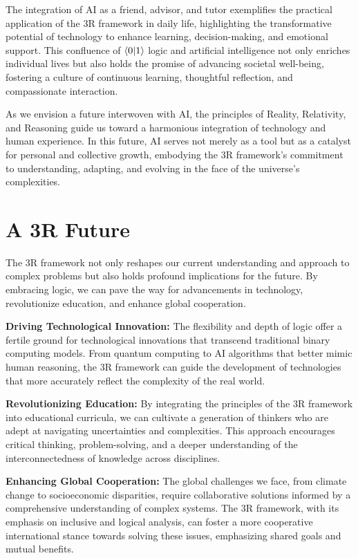 \documentclass[12pt]{article}
\begin{document}
The integration of AI as a friend, advisor, and tutor exemplifies the practical application of the 3R framework in daily life, highlighting the transformative potential of technology to enhance learning, decision-making, and emotional support. This confluence of \(\langle 0 | 1 \rangle\) logic and artificial intelligence not only enriches individual lives but also holds the promise of advancing societal well-being, fostering a culture of continuous learning, thoughtful reflection, and compassionate interaction.

As we envision a future interwoven with AI, the principles of Reality, Relativity, and Reasoning guide us toward a harmonious integration of technology and human experience. In this future, AI serves not merely as a tool but as a catalyst for personal and collective growth, embodying the 3R framework's commitment to understanding, adapting, and evolving in the face of the universe's complexities.

\section*{A 3R Future}

The 3R framework not only reshapes our current understanding and approach to complex problems but also holds profound implications for the future. By embracing \qbit{} logic, we can pave the way for advancements in technology, revolutionize education, and enhance global cooperation.

\textbf{Driving Technological Innovation:} The flexibility and depth of \qbit{} logic offer a fertile ground for technological innovations that transcend traditional binary computing models. From quantum computing to AI algorithms that better mimic human reasoning, the 3R framework can guide the development of technologies that more accurately reflect the complexity of the real world.

\textbf{Revolutionizing Education:} By integrating the principles of the 3R framework into educational curricula, we can cultivate a generation of thinkers who are adept at navigating uncertainties and complexities. This approach encourages critical thinking, problem-solving, and a deeper understanding of the interconnectedness of knowledge across disciplines.

\textbf{Enhancing Global Cooperation:} The global challenges we face, from climate change to socioeconomic disparities, require collaborative solutions informed by a comprehensive understanding of complex systems. The 3R framework, with its emphasis on inclusive and logical analysis, can foster a more cooperative international stance towards solving these issues, emphasizing shared goals and mutual benefits.
\end{document}
